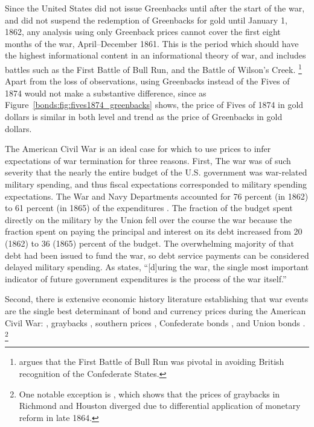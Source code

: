 Since the United States did not issue Greenbacks until after the start of the war, and did not suspend the redemption of Greenbacks for gold until January 1, 1862, any analysis using only Greenback prices cannot cover the first eight months of the war, April--December 1861.
This is the period which should have the highest informational content in an informational theory of war, and includes battles such as the First Battle of Bull Run, and the Battle of Wilson's Creek.%
\footnote{\textcite{Poast2012} argues that the First Battle of Bull Run was pivotal in avoiding British recognition of the Confederate States.}
Apart from the loss of observations, using Greenbacks instead of the Fives of 1874 would not make a substantive difference, since as Figure~\ref{bonds:fig:fives1874_greenbacks} shows, the price of Fives of 1874 in gold dollars is similar in both level and trend as the price of Greenbacks in gold dollars.

The American Civil War is an ideal case for which to use prices to infer expectations of war termination for three reasons.
First, The war was of such severity that the nearly the entire budget of the U.S. government was war-related military spending, and thus fiscal expectations corresponded to military spending expectations. %
The War and Navy Departments accounted for 76 percent (in 1862) to 61 percent (in 1865) of the expenditures \parencites{Treasury1861a}{Treasury1861b}{Treasury1862}{Treasury1863}{Treasury1864}{Treasury1865}.
The fraction of the budget spent directly on the military by the Union fell over the course the war because the fraction spent on paying the principal and interest on its debt increased from 20 (1862) to 36 (1865) percent of the budget.
The overwhelming majority of that debt had been issued to fund the war, so debt service payments can be considered delayed military spending. 
As \textcite[][668]{McCandless1996} states, ``[d]uring the war, the single most important indicator of future government expenditures is the process of the war itself.''

Second, there is extensive economic history literature establishing that war events are the single best determinant of bond and currency prices during the American Civil War:
\parencites{Mitchell1903}{Mitchell1908}{Calomiris1988}{WillardGuinnaneEtAl1996}{McCandless1996}{SmithSmith1997}, graybacks \parencites{Schwab1901}{Weidenmier2002}, southern prices
\parencite{BurdekinLangdana1993}, Confederate bonds \parencites{DavisPecquet1990}{BrownBurdekin2000}{OosterlinckWeidenmier2007}, and Union bonds \parencite{Roll1972}.%
\footnote{One notable exception is \textcite{BurdekinWeidenmier2001}, which shows that the prices of graybacks in Richmond and Houston diverged due to differential application of monetary reform in late 1864.}

